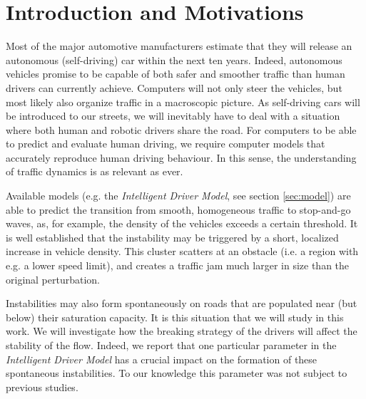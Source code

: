 \section{Introduction and Motivations}
Most of the major automotive manufacturers estimate that they will release an autonomous (self-driving) car within the next ten years. Indeed, autonomous vehicles promise to be capable of both safer and smoother traffic than human drivers can currently achieve. Computers will not only steer the vehicles, but most likely also organize traffic in a macroscopic picture. As self-driving cars will be introduced to our streets, we will inevitably have to deal with a situation where both human and robotic drivers share the road. For computers to be able to predict and evaluate human driving, we require computer models that accurately reproduce human driving behaviour. In this sense, the understanding of traffic dynamics is as relevant as ever.

Available models (e.g. the \emph{Intelligent Driver Model}, see section \ref{sec:model}) are able to predict the transition from smooth, homogeneous traffic to stop-and-go waves, as, for example, the density of the vehicles exceeds a certain threshold. It is well established \cite{treiber1999, treiber2000, treiber2013} that the instability may be triggered by a short, localized increase in vehicle density. This cluster scatters at an obstacle (i.e. a region with e.g. a lower speed limit), and creates a traffic jam much larger in size than the original perturbation.

Instabilities may also form spontaneously on roads that are populated near (but below) their saturation capacity. It is this situation that we will study in this work. We will investigate how the breaking strategy of the drivers will affect the stability of the flow. Indeed, we report that one particular parameter in the \emph{Intelligent Driver Model} has a crucial impact on the formation of these spontaneous instabilities. To our knowledge this parameter was not subject to previous studies.

